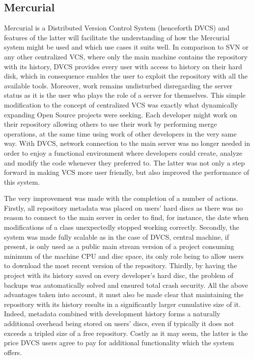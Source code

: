 \subsection{Mercurial}\label{subsec:hg}
Mercurial is a Distributed Version Control System (henceforth DVCS) and features of the latter will facilitate the understanding of how the Mercurial system might be used and which use cases it suits well. In comparison to SVN or any other centralized VCS, where only the main machine contains the repository with its history, DVCS provides every user with access to history on their hard disk, which in consequence enables the user to exploit the repository with all the available tools. Moreover, work remains undisturbed disregarding the server status as it is the user who plays the role of a server for themselves. This simple modification to the concept of centralized VCS was exactly what dynamically expanding Open Source projects were seeking. Each developer might work on their repository allowing others to use their work by performing merge operations, at the same time using work of other developers in the very same way. With DVCS, network connection to the main server was no longer needed in order to enjoy a functional environment where developers could create, analyze and modify the code whenever they preferred to. The latter was not only a step forward in making VCS more user friendly, but also improved the performance of this system. 

The very improvement was made with the completion of a number of actions. Firstly, all repository metadata was placed on users' hard discs as there was no reason to connect to the main server in order to find, for instance, the date when modifications of a class unexpectedly stopped working correctly. Secondly, the system was made fully scalable as in the case of DVCS, central machine, if present, is only used as a public main stream version of a project consuming minimum of the machine CPU and disc space, its only role being to allow users to download the most recent version of the repository. Thirdly, by having the project with its history saved on every developer's hard disc, the problem of backups was automatically solved and ensured total crash security. All the above advantages taken into account, it must also be made clear that  maintaining the repository with its history results in a significantly larger cumulative size of it. Indeed, metadata combined with development history forms a naturally additional overhead being stored on users' discs, even if typically it does not exceeds a tripled size of a free repository. Costly as it may seem, the latter is the price DVCS users agree to pay for additional functionality which the system offers. 

